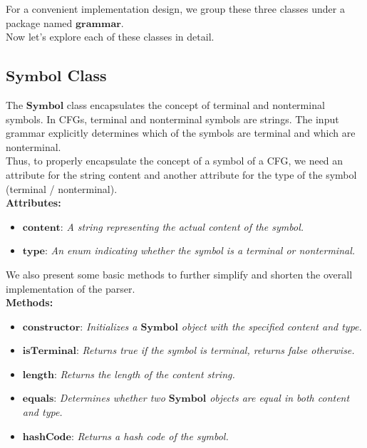 For a convenient implementation design, we group these three classes under a package named \(\boldsymbol{grammar}\).\\

Now let’s explore each of these classes in detail.

\subsection{\(\boldsymbol{Symbol}\) Class}

The \(\boldsymbol{Symbol}\) class encapsulates the concept of terminal and nonterminal symbols. In CFGs, terminal and nonterminal symbols are strings. The input grammar explicitly determines which of the symbols are terminal and which are nonterminal.\\
Thus, to properly encapsulate the concept of a symbol of a CFG, we need an attribute for the string content and another attribute for the type of the symbol (terminal / nonterminal).\\

\textbf{Attributes:}
\begin{itemize}
    \item \(\boldsymbol{content}\): \textit{A string representing the actual content of the symbol.}
    \item \(\boldsymbol{type}\): \textit{An enum indicating whether the symbol is a terminal or nonterminal.}
\end{itemize}

We also present some basic methods to further simplify and shorten the overall implementation of the parser.\\

\textbf{Methods:}
\begin{itemize}
    \item \(\boldsymbol{constructor}\): \textit{Initializes a \(\boldsymbol{Symbol}\) object with the specified content and type.}
    \item \(\boldsymbol{isTerminal}\): \textit{Returns true if the symbol is terminal, returns false otherwise.}
    \item \(\boldsymbol{length}\): \textit{Returns the length of the content string.}
    \item \(\boldsymbol{equals}\): \textit{Determines whether two \(\boldsymbol{Symbol}\) objects are equal in both content and type.}
    \item \(\boldsymbol{hashCode}\): \textit{Returns a hash code of the symbol.}
\end{itemize}


